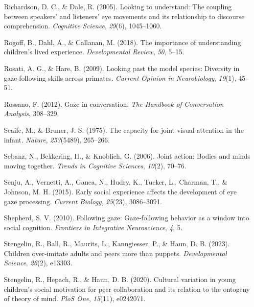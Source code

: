 \documentclass[
  man,floatsintext]{apa7}
\newlength{\cslhangindent}
\newenvironment{CSLReferences}[2] %
 {\begin{list}{}{%
  \setlength{\itemindent}{0pt}
  \setlength{\leftmargin}{0pt}
  \setlength{\parsep}{0pt}
  \ifodd #1
   \setlength{\leftmargin}{\cslhangindent}
   \setlength{\itemindent}{-1\cslhangindent}
  \fi
  \setlength{\itemsep}{#2\baselineskip}}}
 {\end{list}}
\begin{document}
\begin{CSLReferences}{1}{0}
Richardson, D. C., \& Dale, R. (2005). Looking to understand: The coupling between speakers' and listeners' eye movements and its relationship to discourse comprehension. \emph{Cognitive Science}, \emph{29}(6), 1045--1060.

Rogoff, B., Dahl, A., \& Callanan, M. (2018). The importance of understanding children's lived experience. \emph{Developmental Review}, \emph{50}, 5--15.

Rosati, A. G., \& Hare, B. (2009). Looking past the model species: Diversity in gaze-following skills across primates. \emph{Current Opinion in Neurobiology}, \emph{19}(1), 45--51.

Rossano, F. (2012). Gaze in conversation. \emph{The Handbook of Conversation Analysis}, 308--329.

Scaife, M., \& Bruner, J. S. (1975). The capacity for joint visual attention in the infant. \emph{Nature}, \emph{253}(5489), 265--266.

Sebanz, N., Bekkering, H., \& Knoblich, G. (2006). Joint action: Bodies and minds moving together. \emph{Trends in Cognitive Sciences}, \emph{10}(2), 70--76.

Senju, A., Vernetti, A., Ganea, N., Hudry, K., Tucker, L., Charman, T., \& Johnson, M. H. (2015). Early social experience affects the development of eye gaze processing. \emph{Current Biology}, \emph{25}(23), 3086--3091.

Shepherd, S. V. (2010). Following gaze: Gaze-following behavior as a window into social cognition. \emph{Frontiers in Integrative Neuroscience}, \emph{4}, 5.

Stengelin, R., Ball, R., Maurits, L., Kanngiesser, P., \& Haun, D. B. (2023). Children over-imitate adults and peers more than puppets. \emph{Developmental Science}, \emph{26}(2), e13303.

Stengelin, R., Hepach, R., \& Haun, D. B. (2020). Cultural variation in young children's social motivation for peer collaboration and its relation to the ontogeny of theory of mind. \emph{PloS One}, \emph{15}(11), e0242071.


\end{CSLReferences}
\end{document}
